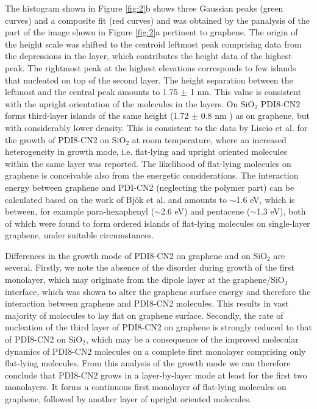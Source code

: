 \documentclass[review]{elsarticle}
\begin{document}
The histogram shown in Figure \ref{fig:2}b shows three Gaussian peaks (green curves) and a composite fit (red curves) and was obtained by the panalysis of the part of the image shown in Figure \ref{fig:2}a pertinent to graphene.
 The origin of the height scale was shifted to the centroid leftmost peak comprising data from the depressions in the layer, which contributes the height data of the highest peak.
 The rightmost peak at the highest elevations corresponds to few islands that nucleated on top of the second layer.
 The height separation between the leftmost and the central peak amounts to 1.75 $\pm$ 1 nm.
 This value is consistent with the upright orientation of the molecules in the layers.
 On  SiO$_{2}$  PDI8-CN2 forms   third-layer islands of the same height (1.72 $\pm$ 0.8 nm ) as on graphene, but with considerably lower density.
 This is consistent to the data by Liscio et al.
 for the growth of PDI8-CN2 on SiO$_{2}$ at room temperature, where an increased heterogeneity in growth mode, i.e. flat-lying and upright oriented molecules within the same layer was reported.
 The likelihood of flat-lying molecules on graphene is conceivable also from the energetic considerations.
 The interaction energy between graphene and PDI-CN2 (neglecting the polymer part) can be calculated based on the work of Bj\"{o}k et al.
\cite{bjork-2010} and amounts to $\sim$1.6 eV, which is between, for example para-hexaphenyl ($\sim$2.6 eV) and pentacene ($\sim$1.3 eV), both of which were found to form ordered islands of flat-lying molecules on single-layer graphene, under suitable circumstances\cite{kratzer-2016}.


Differences in the growth mode of PDI8-CN2 on graphene and on SiO$_{2}$ are several.
 Firstly, we note the absence of the disorder during growth of the first monolayer, which may originate from the dipole layer at the graphene/SiO$_{2}$ interface, which was shown to alter the graphene surface energy and therefore the interaction between graphene and PDI8-CN2 molecules\cite{sabio-2008,chhikara-2014}.
 This results in vast majority of molecules to lay flat on graphene surface\cite{kratzer-2016}.
  Secondly, the rate of nucleation of the third layer of PDI8-CN2 on graphene is strongly reduced to that of PDI8-CN2 on SiO$_{2}$, which may be a consequence of the improved molecular dynamics of PDI8-CN2 molecules on a complete first monolayer comprising only flat-lying molecules.
   From this analysis of the growth mode we can therefore conclude that PDI8-CN2 grows in a layer-by-layer mode at least for the first two monolayers.
 It forms a continuous first monolayer of flat-lying molecules on graphene, followed by another layer of upright oriented molecules.
\end{document}
